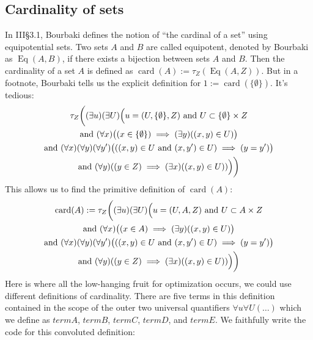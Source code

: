 \documentclass{amsart}
\newcommand{\Varid}[1]{\mathit{#1}}
\DeclareMathOperator{\card}{card}
\DeclareMathOperator{\Eq}{Eq}
\begin{document}
\subsection{Cardinality of sets}
In III\S3.1, Bourbaki defines the notion of ``the cardinal of a set''
using equipotential sets.
Two sets $A$ and $B$ are called equipotent, denoted by Bourbaki as
$\Eq(A,B)$, if there exists a bijection between sets $A$ and $B$.
Then the cardinality of a set $A$ is defined as $\card(A):=\tau_{Z}(\Eq(A,Z))$.
But in a footnote, Bourbaki tells us the explicit definition for 
$1:=\card(\{\emptyset\})$. It's tedious:
\begin{multline}
  \tau_{Z}\biggl(
(\exists u)(\exists U)\Bigl(u=(U,\{\emptyset\},Z)\mbox{ and }U\subset\{\emptyset\}\times Z\\
\mbox{and }(\forall x)\bigl((x\in\{\emptyset\})\implies(\exists y)((x,y)\in U)\bigr)\\
\mbox{and }(\forall x)(\forall y)(\forall y')\bigl(((x,y)\in U\mbox{ and }(x,y')\in U)\implies(y=y')\bigr)\\
\mbox{and }(\forall y)((y\in Z)\implies(\exists x)((x,y)\in U))\Bigr)
\biggr)
\end{multline}
This allows us to find the primitive definition of $\card(A)$:
\begin{multline}
\card(A):=\tau_{Z}\biggl(
(\exists u)(\exists U)\Bigl(u=(U,A,Z)\mbox{ and }U\subset A\times Z\\
\mbox{and }(\forall x)\bigl((x\in A)\implies(\exists y)((x,y)\in U)\bigr)\\
\mbox{and }(\forall x)(\forall y)(\forall y')\bigl(((x,y)\in U\mbox{ and }(x,y')\in U)\implies(y=y')\bigr)\\
\mbox{and }(\forall y)((y\in Z)\implies(\exists x)((x,y)\in U))\Bigr)
\biggr)
\end{multline}
Here is where all the low-hanging fruit for optimization occurs, we
could use different definitions of cardinality. There are five terms in
this definition contained in the scope of the outer two universal
quantifiers $\forall u\forall U(\dots)$ which we define as \ensuremath{\Varid{termA}},
\ensuremath{\Varid{termB}}, \ensuremath{\Varid{termC}}, \ensuremath{\Varid{termD}}, and \ensuremath{\Varid{termE}}. We faithfully write the
code for this convoluted definition:
\end{document}
